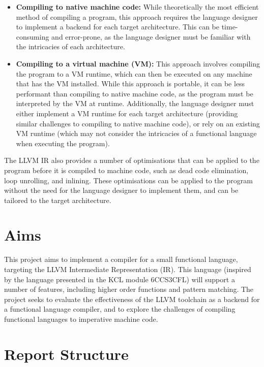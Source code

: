 \begin{itemize}
    \item \textbf{Compiling to native machine code:} While theoretically the most efficient method
          of compiling a program, this approach requires the language designer to implement a
          backend for each target architecture. This can be time-consuming and error-prone, as the
          language designer must be familiar with the intricacies of each architecture.

    \item \textbf{Compiling to a virtual machine (VM):} This approach involves compiling the program
          to a VM runtime, which can then be executed on any machine that has the VM installed.
          While this approach is portable, it can be less performant than compiling to native
          machine code, as the program must be interpreted by the VM at runtime. Additionally, the
          language designer must either implement a VM runtime for each target architecture
          (providing similar challenges to compiling to native machine code), or rely on an existing
          VM runtime (which may not consider the intricacies of a functional language when executing
          the program).
\end{itemize}

The LLVM IR also provides a number of optimisations that can be applied to the program before it is
compiled to machine code, such as dead code elimination, loop unrolling, and inlining. These
optimisations can be applied to the program without the need for the language designer to implement
them, and can be tailored to the target architecture.

\section{Aims}

This project aims to implement a compiler for a small functional language, targeting the LLVM
Intermediate Representation (IR). This language (inspired by the language presented in the KCL
module 6CCS3CFL) will support a number of features, including higher order functions and pattern
matching. The project seeks to evaluate the effectiveness of the LLVM toolchain as a backend for a
functional language compiler, and to explore the challenges of compiling functional languages to
imperative machine code.

\section{Report Structure}

